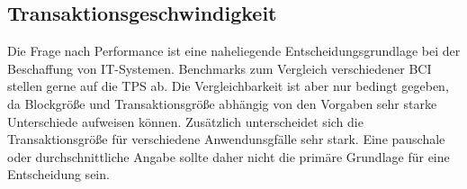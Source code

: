 \subsection{Transaktionsgeschwindigkeit}\label{krit:transaktionsgeschwindigkeit}

Die Frage nach Performance ist eine naheliegende Entscheidungsgrundlage bei der Beschaffung von IT-Systemen.
Benchmarks zum Vergleich verschiedener \gls{BCI} stellen gerne auf die \gls{TPS} ab.
Die Vergleichbarkeit ist aber nur bedingt gegeben, da Blockgröße und Transaktionsgröße abhängig von den Vorgaben sehr starke Unterschiede aufweisen können.
Zusätzlich unterscheidet sich die Transaktionsgröße für verschiedene Anwendunsgfälle sehr stark.
Eine pauschale oder durchschnittliche Angabe sollte daher nicht die primäre Grundlage für eine Entscheidung sein.





